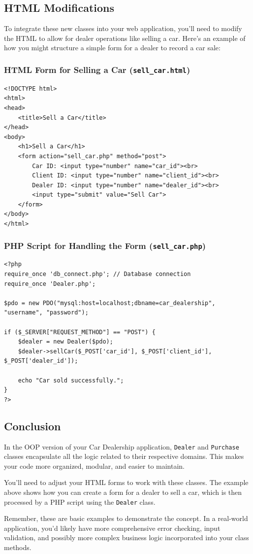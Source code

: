 \documentclass[11pt]{article}
\begin{document}
\subsection{HTML Modifications}
\label{sec:orgafbc99f}
To integrate these new classes into your web application, you'll need to
modify the HTML to allow for dealer operations like selling a car.
Here's an example of how you might structure a simple form for a dealer
to record a car sale:

\subsubsection{HTML Form for Selling a Car (\texttt{sell\_car.html})}
\label{sec:orgc1a2d11}
\begin{verbatim}
<!DOCTYPE html>
<html>
<head>
    <title>Sell a Car</title>
</head>
<body>
    <h1>Sell a Car</h1>
    <form action="sell_car.php" method="post">
        Car ID: <input type="number" name="car_id"><br>
        Client ID: <input type="number" name="client_id"><br>
        Dealer ID: <input type="number" name="dealer_id"><br>
        <input type="submit" value="Sell Car">
    </form>
</body>
</html>
\end{verbatim}

\subsubsection{PHP Script for Handling the Form (\texttt{sell\_car.php})}
\label{sec:org5de82da}
\begin{verbatim}
<?php
require_once 'db_connect.php'; // Database connection
require_once 'Dealer.php';

$pdo = new PDO("mysql:host=localhost;dbname=car_dealership", "username", "password");

if ($_SERVER["REQUEST_METHOD"] == "POST") {
    $dealer = new Dealer($pdo);
    $dealer->sellCar($_POST['car_id'], $_POST['client_id'], $_POST['dealer_id']);

    echo "Car sold successfully.";
}
?>
\end{verbatim}

\subsection{Conclusion}
\label{sec:orge6bff31}
In the OOP version of your Car Dealership application, \texttt{Dealer} and
\texttt{Purchase} classes encapsulate all the logic related to their respective
domains. This makes your code more organized, modular, and easier to
maintain.

You'll need to adjust your HTML forms to work with these classes. The
example above shows how you can create a form for a dealer to sell a
car, which is then processed by a PHP script using the \texttt{Dealer} class.

Remember, these are basic examples to demonstrate the concept. In a
real-world application, you'd likely have more comprehensive error
checking, input validation, and possibly more complex business logic
incorporated into your class methods.
\end{document}
